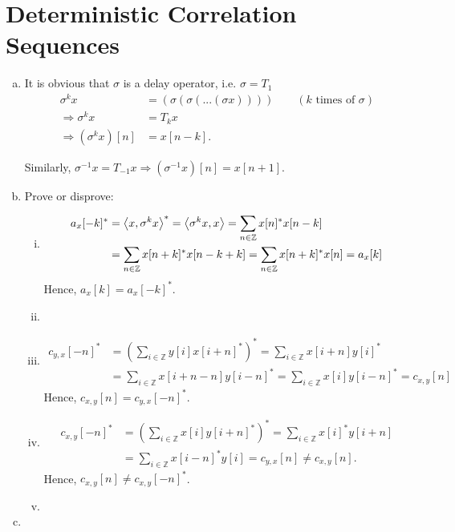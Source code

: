 \section{Deterministic Correlation Sequences}\label{sec:p1}

\begin{enumerate}[(a)]
\item It is obvious that $\sigma$ is a delay operator, i.e. $\sigma = T_1$
\begin{align*}
	\sigma^k x &= (\sigma(\sigma(...(\sigma x)))) \qquad (k \text{ times of } \sigma) \\
	\Rightarrow \sigma^k x &= T_k x \\
	\Rightarrow (\sigma ^k x)[n] &= x[n-k].
\end{align*}

Similarly, $\sigma^{-1} x = T_{-1} x \Rightarrow (\sigma^{-1} x)[n] = x[n+1]$.

\item Prove or disprove:
\begin{enumerate}[i.]
	\item \begin{align*}
		a_x[-k]^* &= \left\langle x, \sigma^k x \right\rangle^* = \left\langle \sigma^k x, x \right\rangle = \sum_{n \in \mathbb{Z}} x[n]^* x[n-k] \\
		&= \sum_{n \in \mathbb{Z}} x[n+k]^* x[n-k+k] = \sum_{n \in \mathbb{Z}} x[n+k]^* x[n] = a_x[k]
	\end{align*}
	Hence, $a_x[k] = a_x[-k]^*$.
	\item 
	\item \begin{align*}
		c_{y,x}[-n]^* &= \left(\sum_{i \in \mathbb{Z}} y[i] x[i+n]^*\right)^* = \sum_{i \in \mathbb{Z}} x[i+n]y[i]^* \\
		&= \sum_{i \in \mathbb{Z}} x[i+n-n]y[i-n]^* = \sum_{i \in \mathbb{Z}} x[i]y[i-n]^* = c_{x,y}[n]
	\end{align*}
	Hence, $c_{x,y}[n] = c_{y,x}[-n]^*$.
	\item \begin{align*}
		c_{x,y}[-n]^* &= \left(\sum_{i \in \mathbb{Z}} x[i] y[i+n]^*\right)^* = \sum_{i \in \mathbb{Z}} x[i]^*y[i+n] \\
		&= \sum_{i \in \mathbb{Z}} x[i-n]^*y[i] = c_{y,x}[n] \neq c_{x,y}[n].
	\end{align*}
	Hence, $c_{x,y}[n] \neq c_{x,y}[-n]^*$.
	\item
\end{enumerate}

\item 
\end{enumerate}